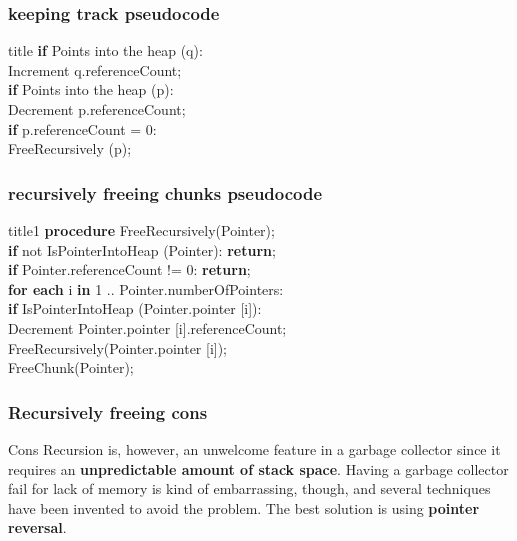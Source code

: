 \documentclass[presentation]{beamer}
\begin{document}
\begin{frame}
  \frametitle{keeping track pseudocode}
  \justifying
  \begin{block}{title}
  \textbf{if} Points into the heap (q):\\ \hspace*{20pt} Increment q.referenceCount;\\ \textbf{if} Points into the heap (p):\\ \hspace*{20pt} Decrement p.referenceCount;\\ \hspace*{20pt} \textbf{if} p.referenceCount = 0:\\ \hspace*{40pt} FreeRecursively (p);
  \end{block}
\end{frame}  

\begin{frame}
  \frametitle{recursively freeing chunks pseudocode}
  \justifying  
  \begin{block}{title1}
  \textbf{procedure} FreeRecursively(Pointer); \\
\hspace*{20pt} \textbf{if} not IsPointerIntoHeap (Pointer): \textbf{return};\\
\hspace*{20pt} \textbf{if} Pointer.referenceCount != 0: \textbf{return};\\
\hspace*{20pt} \textbf{for each} i \textbf{in} 1 .. Pointer.numberOfPointers: \\
\hspace*{40pt} \textbf{if} IsPointerIntoHeap (Pointer.pointer [i]): \\
\hspace*{60pt} Decrement Pointer.pointer [i].referenceCount; \\
\hspace*{60pt} FreeRecursively(Pointer.pointer [i]); \\
\hspace*{20pt} FreeChunk(Pointer); \\
  \end{block}
\end{frame}

\begin{frame}
  \frametitle{Recursively freeing cons} 
  \justifying
      \begin{alertblock}{Cons}
        Recursion is, however, an unwelcome feature in a garbage collector since it requires an \textbf{unpredictable amount of stack space}. Having a garbage collector fail for lack of memory is kind of embarrassing, though, and several techniques
have been invented to avoid the problem. The best solution is using \textbf{pointer reversal}.
    \end{alertblock}
\end{frame}
\end{document}
